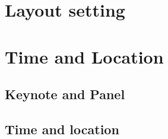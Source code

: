 
\ifJustHint \chapter{Layout setting} \fi
\newcommand{\showPaper}[1]{
\ifOnePage  \fi
\ifAllPage  \fi
}

\newcommand{\authorWidth}{6cm}
\newcommand{\titleWidth}{10cm}
\newcommand{\tableHeader}{ID & 作者 & 論文名稱 \\ \hline}

\newcommand{\updateNameNotify}{\newline \newline * 作者與論文名稱取自 \href{https://easychair.org/conferences/?conf=tcse2017}{EasyChair} 投稿系統的欄位訊息，若需修改可於 6/15 日前上系統更正。大會手冊最終版會以 [姓-名] (regular paper) 或 [First Name-Last Name] (English paper) 的格式呈現。}

\ifJustHint \chapter{Time and Location} \fi

\ifJustHint \section{Keynote and Panel} \fi

\newcommand{\TimeKeynoteOne}{時間: 9:30-10:20, 7/7}
\newcommand{\TimeKeynoteTwo}{時間: 9:30-10:20, 7/8}
\newcommand{\TimePanel}{時間: 16:50, 7/7}
\newcommand{\LocationKeynoteOne}{地點：學思樓 第九國際會議廳}
\newcommand{\LocationKeynoteTwo}{地點：學思樓 第九國際會議廳}
\newcommand{\LocationPanel}{地點：學思樓 第九國際會議廳}

\newcommand{\TimeIndustryOne}{時間：13:20-14:05 (2D), 7/7}
\newcommand{\TimeIndustryTwo}{時間：14:05-14:50 (2D), 7/7}
\newcommand{\TimeIndustryThree}{時間：10:40-11:25 (4D), 7/8}
\newcommand{\LocationIndustryOne}{地點：學思樓 第九國際會議廳}
\newcommand{\LocationIndustryTwo}{地點：學思樓 第九國際會議廳}
\newcommand{\LocationIndustryThree}{地點：學思樓 第九國際會議廳}

\ifJustHint \section{Time and location} \fi

